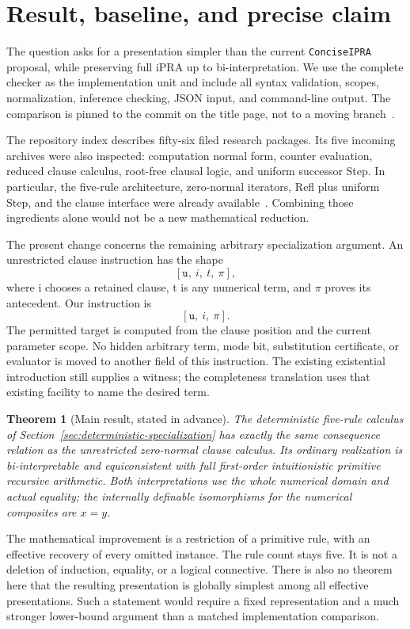 \documentclass[11pt,letterpaper]{article}
\newtheorem{theorem}{Theorem}[section]
\theoremstyle{definition}
\begin{document}
\section{Result, baseline, and precise claim}

The question asks for a presentation simpler than the current
\texttt{ConciseIPRA} proposal, while
preserving full iPRA up to bi-interpretation. We use the complete checker
as the implementation unit and include all syntax validation, scopes,
normalization, inference checking, JSON input, and command-line output.
The comparison is pinned to the commit on the title page, not to a moving
branch~\cite{baseline}.

The repository index describes fifty-six filed research packages. Its
five incoming archives were also inspected: computation normal form,
counter evaluation, reduced clause calculus, root-free clausal logic,
and uniform successor Step. In particular, the five-rule architecture,
zero-normal iterators, Refl plus uniform Step, and the clause interface
were already available~\cite{uniform,rootfree,reduced}. Combining those
ingredients alone would not be a new mathematical reduction.

The present change concerns the remaining arbitrary specialization
argument. An unrestricted clause instruction has the shape
\[
  [\texttt{u},\ i,\ t,\ \pi],
\]
where i chooses a retained clause, t is any numerical term, and
\(\pi\) proves its antecedent. Our instruction is
\[
  \boxed{[\texttt{u},\ i,\ \pi]}.
\]
The permitted target is computed from the clause position and the current
parameter scope. No hidden arbitrary term, mode bit, substitution
certificate, or evaluator is moved to another field of this instruction.
The existing existential introduction still supplies a witness; the
completeness translation uses that existing facility to name the desired
term.

\begin{theorem}[Main result, stated in advance]
The deterministic five-rule calculus of
Section~\ref{sec:deterministic-specialization} has exactly the same
consequence relation as the unrestricted zero-normal clause calculus.
Its ordinary realization is bi-interpretable and equiconsistent with
full first-order intuitionistic primitive recursive arithmetic. Both
interpretations use the whole numerical domain and actual equality;
the internally definable isomorphisms for the numerical composites
are \(x=y\).
\end{theorem}

The mathematical improvement is a restriction of a primitive rule, with
an effective recovery of every omitted instance. The rule count stays
five. It is not a deletion of induction, equality, or a logical
connective. There is also no theorem here that the resulting presentation
is globally simplest among all effective presentations. Such a statement
would require a fixed representation and a much stronger lower-bound
argument than a matched implementation comparison.
\end{document}
